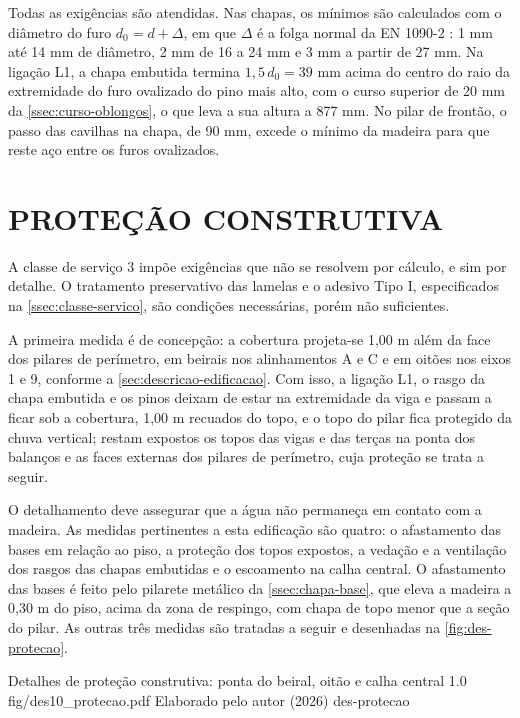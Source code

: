 

Todas as exigências são atendidas. Nas chapas, os mínimos são calculados com o
diâmetro do furo $d_0 = d + \Delta$, em que $\Delta$ é a folga normal da
EN 1090-2 \cite{EN1090-2:2018}: 1 mm até 14 mm de diâmetro, 2 mm de 16 a 24 mm e
3 mm a partir de 27 mm. Na ligação L1, a chapa embutida termina
$1{,}5\,d_0 = 39$ mm acima do centro do raio da extremidade do furo ovalizado do
pino mais alto, com o curso superior de 20 mm da \autoref{ssec:curso-oblongos}, o que
leva a sua altura a 877 mm. No pilar de frontão, o passo
das cavilhas na chapa, de 90 mm, excede o mínimo da madeira para que reste aço
entre os furos ovalizados.

\section{PROTEÇÃO CONSTRUTIVA}\label{sec:protecao-construtiva}

A classe de serviço 3 impõe exigências que não se resolvem por cálculo, e sim
por detalhe. O tratamento preservativo das lamelas e o adesivo Tipo I,
especificados na \autoref{ssec:classe-servico}, são condições necessárias, porém
não suficientes.

A primeira medida é de concepção: a cobertura projeta-se 1,00 m além da face
dos pilares de perímetro, em beirais nos alinhamentos A e C e em oitões nos
eixos 1 e 9, conforme a \autoref{sec:descricao-edificacao}. Com isso, a ligação
L1, o rasgo da chapa embutida e os pinos deixam de estar na extremidade da viga
e passam a ficar sob a cobertura, 1,00 m recuados do topo, e o topo do pilar
fica protegido da chuva vertical; restam expostos os topos das vigas e das
terças na ponta dos balanços e as faces externas dos pilares de perímetro, cuja
proteção se trata a seguir.

O detalhamento deve assegurar que a água não permaneça em contato com a madeira.
As medidas pertinentes a esta edificação são quatro: o afastamento das bases em
relação ao piso, a proteção dos topos expostos, a vedação e a ventilação dos
rasgos das chapas embutidas e o escoamento na calha central. O afastamento das
bases é feito pelo pilarete metálico da \autoref{ssec:chapa-base}, que eleva a
madeira a 0,30 m do piso, acima da zona de respingo, com chapa de topo menor que
a seção do pilar. As outras três medidas são tratadas a seguir e desenhadas na
\autoref{fig:des-protecao}.

\figura
{Detalhes de proteção construtiva: ponta do beiral, oitão e calha central}
{1.0}
{fig/des10_protecao.pdf}
{Elaborado pelo autor (2026)}
{des-protecao}
{}
{}

